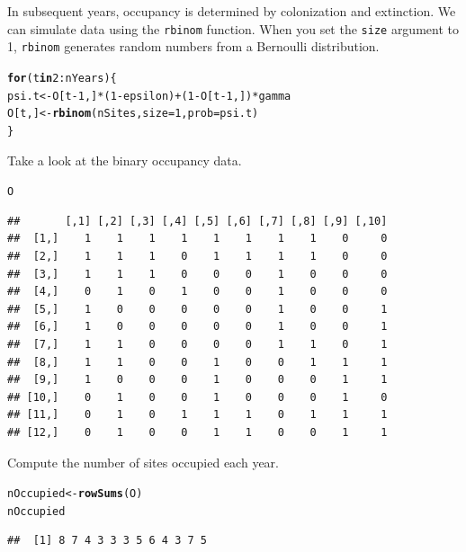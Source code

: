 \documentclass[12pt]{article}\usepackage[]{graphicx}\usepackage[]{color}
\makeatletter
\newcommand{\hlnum}[1]{\textcolor[rgb]{0.686,0.059,0.569}{#1}}%
\newcommand{\hlopt}[1]{\textcolor[rgb]{0,0,0}{#1}}%
\newcommand{\hlstd}[1]{\textcolor[rgb]{0.345,0.345,0.345}{#1}}%
\newcommand{\hlkwa}[1]{\textcolor[rgb]{0.161,0.373,0.58}{\textbf{#1}}}%
\newcommand{\hlkwb}[1]{\textcolor[rgb]{0.69,0.353,0.396}{#1}}%
\newcommand{\hlkwc}[1]{\textcolor[rgb]{0.333,0.667,0.333}{#1}}%
\newcommand{\hlkwd}[1]{\textcolor[rgb]{0.737,0.353,0.396}{\textbf{#1}}}%
\newenvironment{kframe}{%
 \def\at@end@of@kframe{}%
 \ifinner\ifhmode%
  \def\at@end@of@kframe{\end{minipage}}%
  \begin{minipage}{\columnwidth}%
 \fi\fi%
 \def\FrameCommand##1{\hskip\@totalleftmargin \hskip-\fboxsep
 \colorbox{shadecolor}{##1}\hskip-\fboxsep
     \hskip-\linewidth \hskip-\@totalleftmargin \hskip\columnwidth}%
 \MakeFramed {\advance\hsize-\width
   \@totalleftmargin\z@ \linewidth\hsize
   \@setminipage}}%
 {\par\unskip\endMakeFramed%
 \at@end@of@kframe}
\newenvironment{knitrout}{}{} %
\makeatother
\begin{document}
In subsequent years, occupancy is determined by colonization and
extinction. We can simulate data using the {\tt rbinom}
function. When you set the {\tt size} argument to 1, {\tt rbinom}
generates random numbers from a Bernoulli distribution.
\begin{knitrout}
\color{fgcolor}\begin{kframe}
\begin{alltt}
\hlkwa{for}\hlstd{(t} \hlkwa{in} \hlnum{2}\hlopt{:}\hlstd{nYears) \{}
    \hlstd{psi.t} \hlkwb{<-} \hlstd{O[t}\hlopt{-}\hlnum{1}\hlstd{,]}\hlopt{*}\hlstd{(}\hlnum{1}\hlopt{-}\hlstd{epsilon)} \hlopt{+} \hlstd{(}\hlnum{1}\hlopt{-}\hlstd{O[t}\hlopt{-}\hlnum{1}\hlstd{,])}\hlopt{*}\hlstd{gamma}
    \hlstd{O[t,]} \hlkwb{<-} \hlkwd{rbinom}\hlstd{(nSites,} \hlkwc{size}\hlstd{=}\hlnum{1}\hlstd{,} \hlkwc{prob}\hlstd{=psi.t)}
\hlstd{\}}
\end{alltt}
\end{kframe}
\end{knitrout}

Take a look at the binary occupancy data.
\begin{knitrout}
\color{fgcolor}\begin{kframe}
\begin{alltt}
\hlstd{O}
\end{alltt}
\begin{verbatim}
##       [,1] [,2] [,3] [,4] [,5] [,6] [,7] [,8] [,9] [,10]
##  [1,]    1    1    1    1    1    1    1    1    0     0
##  [2,]    1    1    1    0    1    1    1    1    0     0
##  [3,]    1    1    1    0    0    0    1    0    0     0
##  [4,]    0    1    0    1    0    0    1    0    0     0
##  [5,]    1    0    0    0    0    0    1    0    0     1
##  [6,]    1    0    0    0    0    0    1    0    0     1
##  [7,]    1    1    0    0    0    0    1    1    0     1
##  [8,]    1    1    0    0    1    0    0    1    1     1
##  [9,]    1    0    0    0    1    0    0    0    1     1
## [10,]    0    1    0    0    1    0    0    0    1     0
## [11,]    0    1    0    1    1    1    0    1    1     1
## [12,]    0    1    0    0    1    1    0    0    1     1
\end{verbatim}
\end{kframe}
\end{knitrout}

Compute the number of sites occupied each year.
\begin{knitrout}
\color{fgcolor}\begin{kframe}
\begin{alltt}
\hlstd{nOccupied} \hlkwb{<-} \hlkwd{rowSums}\hlstd{(O)}
\hlstd{nOccupied}
\end{alltt}
\begin{verbatim}
##  [1] 8 7 4 3 3 3 5 6 4 3 7 5
\end{verbatim}
\end{kframe}
\end{knitrout}
\end{document}
